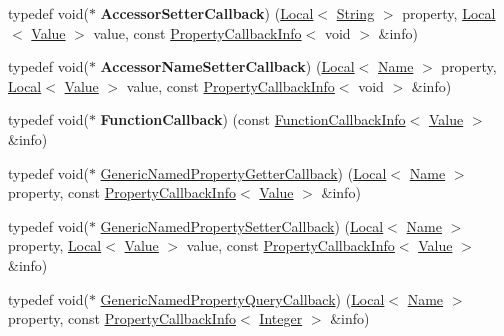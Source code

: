 \begin{DoxyCompactItemize}
typedef void($\ast$ {\bfseries Accessor\+Setter\+Callback}) (\mbox{\hyperlink{classv8_1_1Local}{Local}}$<$ \mbox{\hyperlink{classv8_1_1String}{String}} $>$ property, \mbox{\hyperlink{classv8_1_1Local}{Local}}$<$ \mbox{\hyperlink{classv8_1_1Value}{Value}} $>$ value, const \mbox{\hyperlink{classv8_1_1PropertyCallbackInfo}{Property\+Callback\+Info}}$<$ void $>$ \&info)
\item 
\mbox{\label{namespacev8_a476b359c9fc5ad874bcc2a1a21075556}} 
typedef void($\ast$ {\bfseries Accessor\+Name\+Setter\+Callback}) (\mbox{\hyperlink{classv8_1_1Local}{Local}}$<$ \mbox{\hyperlink{classv8_1_1Name}{Name}} $>$ property, \mbox{\hyperlink{classv8_1_1Local}{Local}}$<$ \mbox{\hyperlink{classv8_1_1Value}{Value}} $>$ value, const \mbox{\hyperlink{classv8_1_1PropertyCallbackInfo}{Property\+Callback\+Info}}$<$ void $>$ \&info)
\item 
\mbox{\label{namespacev8_a9eb0624666bb117aea1fb9c9424dcc1b}} 
typedef void($\ast$ {\bfseries Function\+Callback}) (const \mbox{\hyperlink{classv8_1_1FunctionCallbackInfo}{Function\+Callback\+Info}}$<$ \mbox{\hyperlink{classv8_1_1Value}{Value}} $>$ \&info)
\item 
typedef void($\ast$ \mbox{\hyperlink{namespacev8_a24b1801fa53a7c5a71366d8044927563}{Generic\+Named\+Property\+Getter\+Callback}}) (\mbox{\hyperlink{classv8_1_1Local}{Local}}$<$ \mbox{\hyperlink{classv8_1_1Name}{Name}} $>$ property, const \mbox{\hyperlink{classv8_1_1PropertyCallbackInfo}{Property\+Callback\+Info}}$<$ \mbox{\hyperlink{classv8_1_1Value}{Value}} $>$ \&info)
\item 
typedef void($\ast$ \mbox{\hyperlink{namespacev8_af74716c6e95a269c6cd4314662fd0a7e}{Generic\+Named\+Property\+Setter\+Callback}}) (\mbox{\hyperlink{classv8_1_1Local}{Local}}$<$ \mbox{\hyperlink{classv8_1_1Name}{Name}} $>$ property, \mbox{\hyperlink{classv8_1_1Local}{Local}}$<$ \mbox{\hyperlink{classv8_1_1Value}{Value}} $>$ value, const \mbox{\hyperlink{classv8_1_1PropertyCallbackInfo}{Property\+Callback\+Info}}$<$ \mbox{\hyperlink{classv8_1_1Value}{Value}} $>$ \&info)
\item 
typedef void($\ast$ \mbox{\hyperlink{namespacev8_add9f7ab11e4a9a2b9ad2c4536b0e1a64}{Generic\+Named\+Property\+Query\+Callback}}) (\mbox{\hyperlink{classv8_1_1Local}{Local}}$<$ \mbox{\hyperlink{classv8_1_1Name}{Name}} $>$ property, const \mbox{\hyperlink{classv8_1_1PropertyCallbackInfo}{Property\+Callback\+Info}}$<$ \mbox{\hyperlink{classv8_1_1Integer}{Integer}} $>$ \&info)

\end{DoxyCompactItemize}
